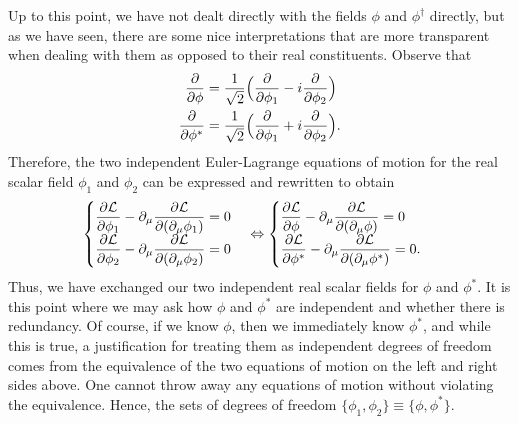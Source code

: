 {Up to this point, we have not dealt directly with the fields $\phi$ and $\phi^{\dagger}$ directly, but as we have seen, there are some nice interpretations that are more transparent when dealing with them as opposed to their real constituents.
Observe that
\begin{align}
    \pdv{\phi} &= \frac{1}{\sqrt{2}} \Big( \pdv{\phi_1} - i \pdv{\phi_2} \Big) \\
    \pdv{\phi^{*}} &= \frac{1}{\sqrt{2}} \Big( \pdv{\phi_1} + i \pdv{\phi_2} \Big)
.\end{align}
Therefore, the two independent Euler-Lagrange equations of motion for the real scalar field $\phi_1$ and $\phi_2$ can be expressed and rewritten to obtain
\begin{align}
\begin{cases}
    \displaystyle \pdv{\mathcal{L}}{\phi_{1}} - \partial_{\mu} \pdv{\mathcal{L}}{(\partial_{\mu} \phi_1)} = 0 \\
    \displaystyle \pdv{\mathcal{L}}{\phi_{2}} - \partial_{\mu} \pdv{\mathcal{L}}{(\partial_{\mu} \phi_2)} = 0
\end{cases}
\Leftrightarrow
\begin{cases}
    \displaystyle \pdv{\mathcal{L}}{\phi} - \partial_{\mu} \pdv{\mathcal{L}}{(\partial_{\mu} \phi)} = 0 \\
    \displaystyle \pdv{\mathcal{L}}{\phi^{*}} - \partial_{\mu} \pdv{\mathcal{L}}{(\partial_{\mu} \phi^{*})} = 0
.\end{cases}
\end{align}
Thus, we have exchanged our two independent real scalar fields for $\phi$ and $\phi^{*}$.
It is this point where we may ask how $\phi$ and $\phi^{*}$ are independent and whether there is redundancy.
Of course, if we know $\phi$, then we immediately know $\phi^{*}$, and while this is true, a justification for treating them as independent degrees of freedom comes from the equivalence of the two equations of motion on the left and right sides above.
One cannot throw away any equations of motion without violating the equivalence.
Hence, the sets of degrees of freedom $\{ \phi_1,\phi_2 \} \equiv \{ \phi,\phi^{*} \}$.

}



